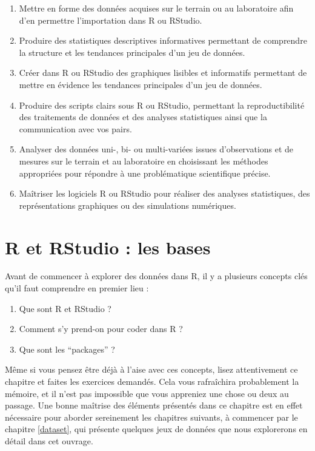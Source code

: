\documentclass[
  a4paper,
]{article}
\providecommand{\tightlist}{%
  \setlength{\itemsep}{0pt}\setlength{\parskip}{0pt}}
\begin{document}
\begin{enumerate}
\def\labelenumi{\arabic{enumi}.}
\tightlist
\item
  Mettre en forme des données acquises sur le terrain ou au laboratoire afin d'en permettre l'importation dans R ou RStudio.
\item
  Produire des statistiques descriptives informatives permettant de comprendre la structure et les tendances principales d'un jeu de données.
\item
  Créer dans R ou RStudio des graphiques lisibles et informatifs permettant de mettre en évidence les tendances principales d'un jeu de données.
\item
  Produire des scripts clairs sous R ou RStudio, permettant la reproductibilité des traitements de données et des analyses statistiques ainsi que la communication avec vos pairs.
\item
  Analyser des données uni-, bi- ou multi-variées issues d'observations et de mesures sur le terrain et au laboratoire en choisissant les méthodes appropriées pour répondre à une problématique scientifique précise.
\item
  Maîtriser les logiciels R ou RStudio pour réaliser des analyses statistiques, des représentations graphiques ou des simulations numériques.
\end{enumerate}

\hypertarget{bases}{%
\section{R et RStudio : les bases}\label{bases}}

Avant de commencer à explorer des données dans R, il y a plusieurs concepts clés qu'il faut comprendre en premier lieu :

\begin{enumerate}
\def\labelenumi{\arabic{enumi}.}
\tightlist
\item
  Que sont R et RStudio ?
\item
  Comment s'y prend-on pour coder dans R ?
\item
  Que sont les ``packages'' ?
\end{enumerate}

Même si vous pensez être déjà à l'aise avec ces concepts, lisez attentivement ce chapitre et faites les exercices demandés. Cela vous rafraîchira probablement la mémoire, et il n'est pas impossible que vous appreniez une chose ou deux au passage. Une bonne maîtrise des éléments présentés dans ce chapitre est en effet nécessaire pour aborder sereinement les chapitres suivants, à commencer par le chapitre \ref{dataset}, qui présente quelques jeux de données que nous explorerons en détail dans cet ouvrage.
\end{document}
